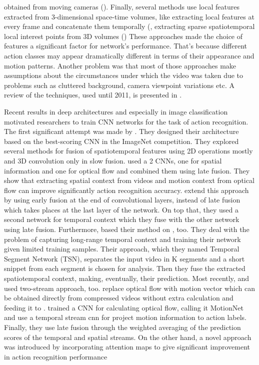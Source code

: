 obtained from moving cameras (\cite{1541251}). Finally, several methods use local features extracted from 3-dimensional space-time volumes,
like extracting local features at every frame and concatenate them temporally (\cite{784616, 990935, 1544882}, extracting sparse
spatiotemporal local interest points from 3D volumes (\cite{1238378, 1570899, Niebles, 1467373, Ryoo2006})
These approaches made the choice of
features a significant factor for network's performance. That's because different action classes may appear dramatically
different in terms of their appearance and motion patterns. Another problem was that most of those approaches make
assumptions about the circumstances under which the video was taken due to problems such as cluttered
background, camera viewpoint variations etc. A review of the techniques, used until 2011, is presented in \cite{Aggarwal:2011:HAA:1922649.1922653}. \par

Recent results in deep architectures and especially in image classification motivated researchers to train CNN networks for
the task of action recognition. The first significant attempt was made by \cite{6909619}. They designed their architecture based on the best-scoring CNN
in the ImageNet competition. They explored several methods for fusion of spatiotemporal features using 2D operations mostly and 3D convolution only in slow fusion.
\cite{simonyan2014two}  used a 2 CNNs, one for spatial information and one for optical flow and combined them using late fusion.
They show that extracting spatial context from videos and motion context from optical flow can improve significantly action recognition accuracy.
\cite{DBLP:journals/corr/FeichtenhoferPZ16} extend this approach by using early fusion at the end of convolutional layers,  instead of late fusion which
takes places at the last layer of the network. On top that, they used a second network for temporal context which they fuse with the other network using late
fusion. Furthermore, \cite{DBLP:journals/corr/WangXW0LTG16} based their method on \cite{simonyan2014two}, too. They deal with the problem of capturing long-range
temporal context and training their network given limited training samples. Their approach, which they named Temporal Segment Network (TSN), separates the input
video in K segments and a short snippet from each segment is chosen for analysis. Then they fuse  the extracted spatiotemporal context, making, eventually, their
prediction.
Most recently, \cite{DBLP:journals/corr/ZhangWWQW16} and \cite{DBLP:journals/corr/ZhuLNH17a} used two-stream approach, too. \cite{DBLP:journals/corr/ZhangWWQW16} replace optical flow with motion vector which can be obtained directly from compressed videos without extra calculation and feeding it to . \cite{DBLP:journals/corr/ZhuLNH17a} trained a CNN for calculating optical flow, calling it
MotionNet and use a temporal stream cnn for project motion information to action labels. Finally, they use late fusion through the weighted averaging of the prediction scores of the temporal and spatial streams. On the other hand, a novel approach was introduced by \cite{DBLP:journals/corr/abs-1711-01467} incorporating attention maps to give significant improvement in action recognition performance \par 

